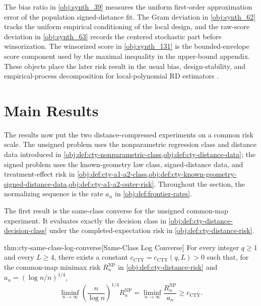 \documentclass[11pt]{article}
\begin{document}
The bias ratio in \cref{obj:synth_39} measures the uniform first-order approximation error of the population signed-distance fit. The Gram deviation in \cref{obj:synth_62} tracks the uniform empirical conditioning of the local design, and the raw-score deviation in \cref{obj:synth_63} records the centered stochastic part before winsorization. The winsorized score in \cref{obj:synth_131} is the bounded-envelope score component used by the maximal inequality in the upper-bound appendix. These objects place the later risk result in the usual bias, design-stability, and empirical-process decomposition for local-polynomial RD estimators \citep{Fan1996,Ruppert1994,Calonico2014,Calonico2020,VanderVaart1996}.


\section{Main Results}
\label{sec:main-results}

The results now put the two distance-compressed experiments on a common risk scale. The unsigned problem uses the nonparametric regression class and distance data introduced in \cref{obj:def:cty-nonparametric-class,obj:def:cty-distance-data}; the signed problem uses the known-geometry law class, signed-distance data, and treatment-effect risk in \cref{obj:def:cty-a1-a2-class,obj:def:cty-known-geometry-signed-distance-data,obj:def:cty-a1-a2-outer-risk}. Throughout the section, the normalizing sequence is the rate \(a_n\) in \cref{obj:def:frontier-rates}.

The first result is the same-class converse for the unsigned common-map experiment. It evaluates exactly the decision class in \cref{obj:def:cty-distance-decision-class} under the completed-expectation risk in \cref{obj:def:cty-distance-risk}.

\begin{theoremv}{thm:cty-same-class-log-converse}[Same-Class Log Converse]
For every integer \(q\geq 1\) and every \(L\geq 4\), there exists a constant \(c_{\mathrm{CTY}}=c_{\mathrm{CTY}}(q,L)>0\) such that, for the common-map minimax risk \(R_n^{\mathrm{NP}}\) in \cref{obj:def:cty-distance-risk} and \(a_n=(\log n/n)^{1/4}\),
\[
\liminf_{n\to\infty}
\left(\frac{n}{\log n}\right)^{1/4} R_n^{\mathrm{NP}}
=
\liminf_{n\to\infty}\frac{R_n^{\mathrm{NP}}}{a_n}
\geq c_{\mathrm{CTY}} .
\]
\end{theoremv}
\end{document}
